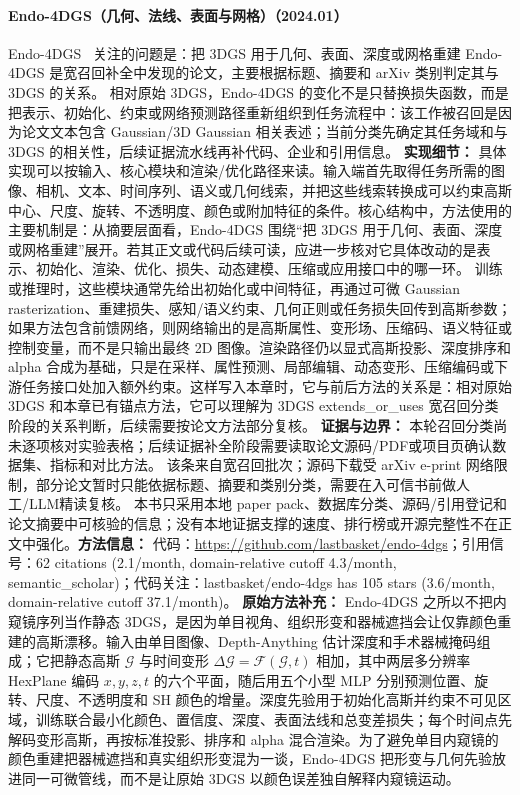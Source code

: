 \paragraph{Endo-4DGS（几何、法线、表面与网格）（2024.01）}
Endo-4DGS~\cite{2401_16416} 关注的问题是：把 3DGS 用于几何、表面、深度或网格重建 Endo-4DGS 是宽召回补全中发现的论文，主要根据标题、摘要和 arXiv 类别判定其与 3DGS 的关系。
相对原始 3DGS，Endo-4DGS 的变化不是只替换损失函数，而是把表示、初始化、约束或网络预测路径重新组织到任务流程中：该工作被召回是因为论文文本包含 Gaussian/3D Gaussian 相关表述；当前分类先确定其任务域和与 3DGS 的相关性，后续证据流水线再补代码、企业和引用信息。
\textbf{实现细节：} 具体实现可以按输入、核心模块和渲染/优化路径来读。输入端首先取得任务所需的图像、相机、文本、时间序列、语义或几何线索，并把这些线索转换成可以约束高斯中心、尺度、旋转、不透明度、颜色或附加特征的条件。核心结构中，方法使用的主要机制是：从摘要层面看，Endo-4DGS 围绕“把 3DGS 用于几何、表面、深度或网格重建”展开。若其正文或代码后续可读，应进一步核对它具体改动的是表示、初始化、渲染、优化、损失、动态建模、压缩或应用接口中的哪一环。 训练或推理时，这些模块通常先给出初始化或中间特征，再通过可微 Gaussian rasterization、重建损失、感知/语义约束、几何正则或任务损失回传到高斯参数；如果方法包含前馈网络，则网络输出的是高斯属性、变形场、压缩码、语义特征或控制变量，而不是只输出最终 2D 图像。渲染路径仍以显式高斯投影、深度排序和 alpha 合成为基础，只是在采样、属性预测、局部编辑、动态变形、压缩编码或下游任务接口处加入额外约束。这样写入本章时，它与前后方法的关系是：相对原始 3DGS 和本章已有锚点方法，它可以理解为 3DGS extends\_or\_uses 宽召回分类阶段的关系判断，后续需要按论文方法部分复核。
\textbf{证据与边界：} 本轮召回分类尚未逐项核对实验表格；后续证据补全阶段需要读取论文源码/PDF或项目页确认数据集、指标和对比方法。 该条来自宽召回批次；源码下载受 arXiv e-print 网络限制，部分论文暂时只能依据标题、摘要和类别分类，需要在入可信书前做人工/LLM精读复核。 本书只采用本地 paper pack、数据库分类、源码/引用登记和论文摘要中可核验的信息；没有本地证据支撑的速度、排行榜或开源完整性不在正文中强化。\textbf{方法信息：} 代码：\url{https://github.com/lastbasket/endo-4dgs}；引用信号：62 citations (2.1/month, domain-relative cutoff 4.3/month, semantic\_scholar)；代码关注：lastbasket/endo-4dgs has 105 stars (3.6/month, domain-relative cutoff 37.1/month)。
\textbf{原始方法补充：} Endo-4DGS 之所以不把内窥镜序列当作静态 3DGS，是因为单目视角、组织形变和器械遮挡会让仅靠颜色重建的高斯漂移。输入由单目图像、Depth-Anything 估计深度和手术器械掩码组成；它把静态高斯 $\mathcal{G}$ 与时间变形 $\Delta\mathcal{G}=\mathcal{F}(\mathcal{G},t)$ 相加，其中两层多分辨率 HexPlane 编码 $x,y,z,t$ 的六个平面，随后用五个小型 MLP 分别预测位置、旋转、尺度、不透明度和 SH 颜色的增量。深度先验用于初始化高斯并约束不可见区域，训练联合最小化颜色、置信度、深度、表面法线和总变差损失；每个时间点先解码变形高斯，再按标准投影、排序和 alpha 混合渲染。为了避免单目内窥镜的颜色重建把器械遮挡和真实组织形变混为一谈，Endo-4DGS 把形变与几何先验放进同一可微管线，而不是让原始 3DGS 以颜色误差独自解释内窥镜运动。
